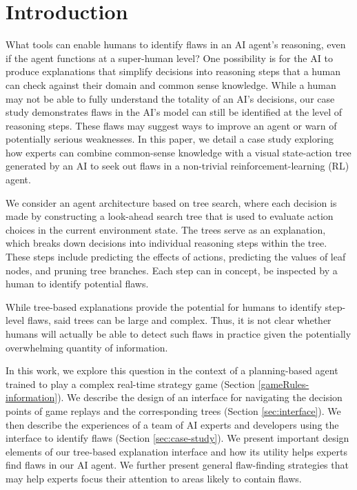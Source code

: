 \documentclass{article}
\begin{document}
\section{Introduction}

\label{introduction}
What tools can enable humans to identify flaws in an AI agent's reasoning, even if the agent functions at a super-human level? One possibility is for the AI to produce explanations that simplify decisions into reasoning steps that a human can check against their domain and common sense knowledge. While a human may not be able to fully understand the totality of an AI's decisions, our case study demonstrates flaws in the AI's model can still be identified at the level of reasoning steps. These flaws may suggest ways to improve an agent or warn of potentially serious weaknesses. 
In this paper, we detail a case study exploring how experts can combine common-sense knowledge with a visual state-action tree generated by an AI to seek out flaws in a non-trivial reinforcement-learning (RL) agent.

We consider an agent architecture based on tree search, where each decision is made by constructing a look-ahead search tree that is used to evaluate action choices in the current environment state. The trees serve as an explanation, which breaks down decisions into individual reasoning steps within the tree. These steps include predicting the effects of actions, predicting the values of leaf nodes, and pruning tree branches. Each step can in concept, be inspected by a human to identify potential flaws. 

While tree-based explanations provide the potential for humans to identify step-level flaws, said trees can be large and complex. Thus, it is not clear whether humans will actually be able to detect such flaws in practice given the potentially overwhelming quantity of information.

In this work, we explore this question in the context of a planning-based agent trained to play a complex real-time strategy game (Section \ref{gameRules-information}). We describe the design of an interface for navigating the decision points of game replays and the corresponding trees (Section \ref{sec:interface}). We then describe the experiences of a team of AI experts and developers using the interface to identify flaws (Section \ref{sec:case-study}). We present important design elements of our tree-based explanation interface and how its utility helps experts find flaws in our AI agent. We further present general flaw-finding strategies that may help experts focus their attention to areas likely to contain flaws.
\end{document}
